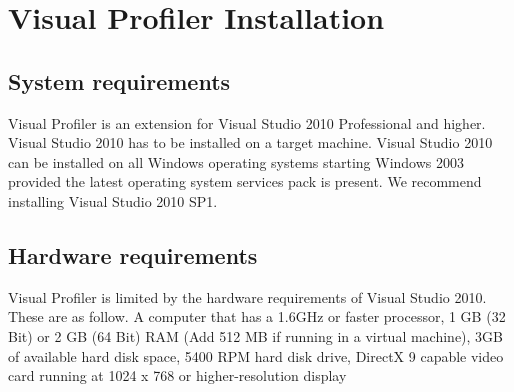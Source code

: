 \chapter{Visual Profiler Installation}
\label{chap:Installation}

\section{System requirements}
Visual Profiler is an extension for Visual Studio 2010 Professional and higher. Visual Studio 2010 has to be installed on a target machine. Visual Studio 2010 can be installed on all Windows operating systems starting Windows 2003 provided the latest operating system services pack is present. We recommend installing Visual Studio 2010 SP1.

\section{Hardware requirements}
Visual Profiler is limited by the hardware requirements of Visual Studio 2010. These are as follow. A computer that has a 1.6GHz or faster processor, 1 GB (32 Bit) or 2 GB (64 Bit) RAM (Add 512 MB if running in a virtual machine), 3GB of available hard disk space, 5400 RPM hard disk drive, DirectX 9 capable video card running at 1024 x 768 or higher-resolution display 	

